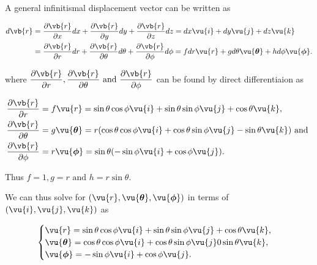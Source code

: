 \documentclass[english,a4paper,12pt]{report}
\begin{document}
A general infinitismal displacement vector can be written as 

\begin{equation}
    \begin{aligned}
    d \vb{r} &= \frac{\partial \vb{r} }{\partial x} dx + \frac{\partial \vb{r} }{\partial y} dy + \frac{\partial \vb{r} }{\partial z} dz = dx \vu{i} + dy \vu{j} + dz \vu{k} \\ &= \frac{\partial \vb{r} }{\partial r} dr + \frac{\partial \vb{r} }{\partial \theta }d\theta + \frac{\partial \vb{r} }{\partial \phi }d \phi =f dr \vu{r} +g d\theta \vu{\boldsymbol{\theta } } +h  d \phi \vu{\boldsymbol{\phi } }. 
    \end{aligned}
\end{equation}

where \(\displaystyle \frac{\partial \vb{r} }{\partial r}, \frac{\partial \vb{r} }{\partial \theta } \text { and } \frac{\partial \vb{r} }{\partial \phi } \) can be found by direct differentiaion as 

\begin{equation}
	\begin{aligned} 
		\frac{\partial \vb{r} }{\partial r}   &= f \vu{r} = \sin{\theta}\cos{\phi}\vu{i} + \sin{\theta}\sin{\phi}\vu{j} + \cos{\theta}\vu{k}, \\
		\frac{\partial \vb{r} }{\partial \theta }  &= g \vu{\boldsymbol{\theta }} = r(\cos{\theta}\cos{\phi}\vu{i} + \cos{\theta}\sin{\phi}\vu{j} - \sin{\theta}\vu{k})\text { and }  \\
		\frac{\partial \vb{r} }{\partial \phi }  &= r \vu{\boldsymbol{\phi } } = \sin \theta (-\sin{\phi}\vu{i} + \cos{\phi}\vu{j}). 
	\end{aligned} 
\end{equation}

Thus \(f = 1, g = r \text { and }  h = r\sin \theta \).

We can thus solve for \((\vu{r} , \vu{\boldsymbol{\theta } }, \vu{\boldsymbol{\phi } })\) in terms of \((\vu{i}, \vu{j} ,\vu{k} )\) as 

\begin{equation}
    \begin{cases}
        \vu{r} = \sin \theta \cos \phi  \vu{i}  + \sin \theta \sin \phi  \vu{j}  + \cos \theta  \vu{k},  \\
        \vu{\boldsymbol{\theta } } = \cos \theta \cos \phi \vu{i}  + \cos \theta \sin \phi \vu{j} 0 \sin \theta \vu{k}, \\
        \vu{\boldsymbol{\phi } } = -\sin \phi  \vu{i} + \cos \phi \vu{j}. 
    \end{cases}
\end{equation}
\end{document}
